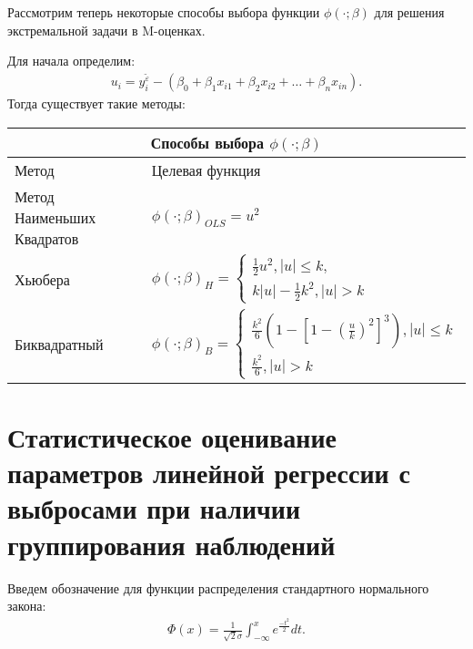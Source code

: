 Рассмотрим теперь некоторые способы выбора функции $\phi(\cdot;\beta)$ для решения экстремальной задачи в M-оценках.

Для начала определим:
\begin{eqnarray}
    u_i=y_i^{\widetilde{\varepsilon}}-(\beta_0+\beta_1 x_{i1}+\beta_2 x_{i2}+\dots+\beta_n x_{in}).
\end{eqnarray}
Тогда существует такие методы\cite{RobustRegression}:\hfill\break
\begin{center}
\begin{tabular}{ |p{3cm}|p{10cm} | }
    \hline
    \multicolumn{2}{|c|}{Способы выбора $\phi(\cdot;\beta)$} \\
    \hline
    Метод& Целевая функция\\
    \hline
    Метод Наименьших Квадратов&$\phi(\cdot;\beta)_{OLS}=u^2$\\
    \hline
    Хьюбера&$\phi(\cdot;\beta)_{H}=
        \begin{cases}
            \frac{1}{2}u^2, |u|\leq k,\\
            k|u|-\frac{1}{2}k^2, |u|>k
        \end{cases}$\\
    \hline
    Биквадратный& $\phi(\cdot;\beta)_{B}=
    \begin{cases}
        \frac{k^2}{6}(1-[1-(\frac{u}{k})^2]^3), |u|\leq k\\
        \frac{k^2}{6}, |u|>k
    \end{cases}$\\
    \hline
\end{tabular}
\end{center}
\newpage

\newpage
\section{Статистическое оценивание параметров линейной регрессии с выбросами при наличии группирования наблюдений}
Введем обозначение для функции распределения стандартного нормального закона:
\begin{eqnarray}
    \Phi(x)=\frac{1}{\sqrt{2}\sigma}\int_{-\infty}^{x}e^{\frac{-t^2}{2}}dt.
\end{eqnarray}

